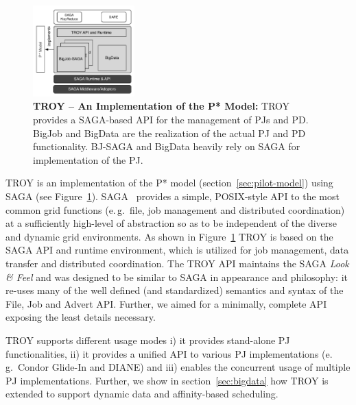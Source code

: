 \documentclass[conference,final]{IEEEtran}
\newcommand{\jhanote}[1]{ {\textcolor{red} { ***shantenu: #1 }}}
\newcommand{\alnote}[1]{ {\textcolor{blue} { ***andre: #1 }}}
\newcommand{\alnote}[1]{}
\newcommand{\jhanote}[1]{}
\newcommand{\upp}{\vspace*{-0.5em}}
\begin{document}

\begin{figure}[t]
	\centering
		\includegraphics[width=0.35\textwidth]{figures/pstar_troy.pdf}
	\caption{\textbf{TROY -- An Implementation of the P* Model:}  TROY provides 
	a SAGA-based API for the management of PJs and PD. BigJob and BigData are 
	the realization of the actual PJ and PD functionality. BJ-SAGA and BigData 
	heavily rely on SAGA for implementation of the PJ.\upp
	}
	\label{fig:figures_pstar_troy}
\end{figure}

TROY is an implementation of the P* model
(section~\ref{sec:pilot-model}) using SAGA (see
Figure~\ref{fig:figures_pstar_troy}). SAGA~\cite{saga_url,saga_gfd90}
provides a simple, POSIX-style API to the most common grid functions
(e.\,g.\ file, job management and distributed coordination) at a
sufficiently high-level of abstraction so as to be independent of the
diverse and dynamic grid environments. As shown in
Figure~\ref{fig:figures_pstar_troy} TROY is based on %
the SAGA API and runtime environment, which is utilized for job
management, data transfer and distributed coordination. The TROY API
maintains the SAGA {\it Look \& Feel} and was designed to be similar
to SAGA in appearance %
and philosophy: it re-uses many of the well defined (and standardized)
semantics and syntax of the File, Job and Advert API. Further, we
aimed for a minimally, complete API exposing the least details
necessary.

TROY supports different usage modes i) it provides stand-alone PJ
functionalities, ii) it provides a unified API to various PJ
implementations (e.\,g.\ Condor Glide-In and DIANE) and iii) enables
the concurrent usage of multiple PJ implementations. Further, we show
in section~\ref{sec:bigdata} how TROY is extended to support dynamic
data and affinity-based scheduling.
\end{document}
